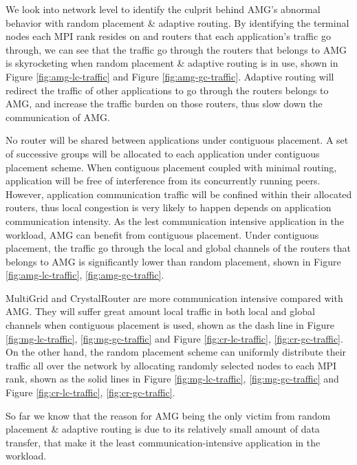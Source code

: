 \documentclass[conference,compsoc]{IEEEtran}
\begin{document}
We look into network level to identify the culprit behind AMG's abnormal behavior with random placement \& adaptive routing. By identifying the terminal nodes each MPI rank resides on and routers that each application's traffic go through, we can see that the traffic go through the routers that belongs to AMG is skyrocketing when random placement \& adaptive routing is in use, shown in Figure \ref{fig:amg-lc-traffic} and Figure \ref{fig:amg-gc-traffic}. Adaptive routing will redirect the traffic of other applications to go through the routers belongs to AMG, and increase the traffic burden on those routers, thus slow down the communication of AMG.

No router will be shared between applications under contiguous placement. A set of successive groups will be allocated to each application under contiguous placement scheme. When contiguous placement coupled with minimal routing, application will be free of interference from its concurrently running peers. However, application communication traffic will be confined within their allocated routers, thus local congestion is very likely to happen depends on application communication intensity. As the lest communication intensive application in the workload, AMG can benefit from contiguous placement. Under contiguous placement, the traffic go through the local and global channels of the routers that belongs to AMG is significantly lower than random placement, shown in Figure \ref{fig:amg-lc-traffic}, \ref{fig:amg-gc-traffic}. 

MultiGrid and CrystalRouter are more communication intensive compared with AMG. They will suffer great amount local traffic in both local and global channels when contiguous placement is used, shown as the dash line in Figure \ref{fig:mg-lc-traffic}, \ref{fig:mg-gc-traffic} and Figure \ref{fig:cr-lc-traffic}, \ref{fig:cr-gc-traffic}. On the other hand, the random placement scheme can uniformly distribute their traffic all over the network by allocating randomly selected nodes to each MPI rank, shown as the solid lines in Figure \ref{fig:mg-lc-traffic}, \ref{fig:mg-gc-traffic} and Figure \ref{fig:cr-lc-traffic}, \ref{fig:cr-gc-traffic}.



So far we know that the reason for AMG being the only victim from random placement \& adaptive routing is due to its relatively small amount of data transfer, that make it the least communication-intensive application in the workload.
\end{document}
